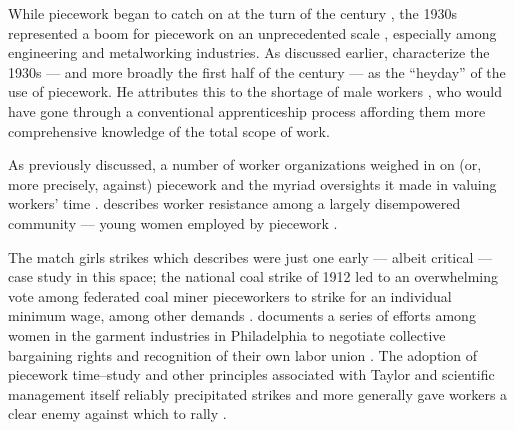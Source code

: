\documentclass[trackingWork]{subfiles}
\begin{document}
While piecework began to catch on at the turn of the  century%
, the 1930s represented a boom for piecework on an unprecedented scale%
, especially among engineering and metalworking industries.
As discussed earlier, \citeauthor{hart2013rise} characterize the 1930s
--- and more broadly the first half of the  century ---
as the ``heyday'' of the use of piecework.
He attributes this to the shortage of male workers%
, who would have gone through a conventional apprenticeship process
affording them more comprehensive knowledge of the total scope of work.


As previously discussed, a number of worker organizations weighed in on
(or, more precisely, against) piecework and the myriad oversights it made in valuing workers' time
\cite{american1921problem,richards1904anything}.
\citeauthor{10.2307/3827491} describes worker resistance among a largely disempowered community --- young women employed by piecework
\cite{10.2307/3827491}.

The match girls strikes which \citeauthor{10.2307/3827491} describes were just one early
--- albeit critical ---
case study in this space;
the national coal strike of 1912 led to an overwhelming vote among federated coal miner pieceworkers
to strike for
an individual minimum wage, among other demands
\cite{10.2307/2221944}.
\citeauthor{10.2307/41829256} documents a series of efforts among women in the garment industries in Philadelphia to negotiate collective bargaining rights and recognition of their own labor union
\cite{10.2307/41829256}.
The adoption of piecework time--study and other principles associated with Taylor and scientific management
itself reliably precipitated strikes and more generally gave workers a clear enemy
against which to rally
\cite{jacoby1983union}.
\end{document}
